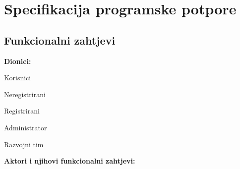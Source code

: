 \chapter{Specifikacija programske potpore}
		
	\section{Funkcionalni zahtjevi}
			
%			
%				
			
			
			\noindent \textbf{Dionici:}
			
			\begin{packed_enum}
				
				\item Korisnici
				
					\begin{packed_enum}
					
						\item Neregistrirani
						\item Registrirani
						
					\end{packed_enum}
					
				\item Administrator			
				\item Razvojni tim
				
			\end{packed_enum}
			
			\noindent \textbf{Aktori i njihovi funkcionalni zahtjevi:}
			
